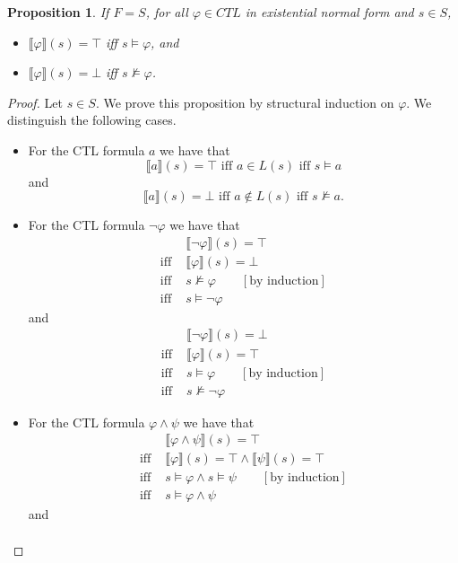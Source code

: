 \documentclass[12pt]{article}
\newtheorem{proposition}{Proposition}
\theoremstyle{definition}
\newcommand{\comment}[1]{\hspace{2em}[\mbox{#1}]}
\newcommand{\satisfaction}[1]{\llbracket #1 \rrbracket}
\newcommand{\bottom}{\mathord{\perp}}
\begin{document}
\begin{proposition}
If $F = S$, for all $\varphi \in \mathit{CTL}$ in existential normal form and $s \in S$, 
\begin{itemize}
\item
$\satisfaction{\varphi}(s) = \top$ iff $s \models \varphi$, and
\item
$\satisfaction{\varphi}(s) = \bottom$ iff $s \not\models \varphi$.
\end{itemize}
\end{proposition}
\begin{proof}
Let $s \in S$.  We prove this proposition by structural induction on $\varphi$.  We distinguish the following cases.
\begin{itemize}
\item 
For the CTL formula $a$ we have that
\[
\satisfaction{a}(s) = \top \mbox{ iff } a \in L(s) \mbox{ iff } s \models a
\]
and
\[
\satisfaction{a}(s) = \bottom \mbox{ iff } a \not\in L(s) \mbox{ iff } s \not\models a.
\]
\item
For the CTL formula $\neg \varphi$ we have that
\begin{align*}
& \satisfaction{\neg \varphi}(s) = \top\\
\mbox{iff } & \satisfaction{\varphi}(s) = \bottom\\
\mbox{iff } & s \not\models \varphi 
\comment{by induction}\\
\mbox{iff } & s \models \neg \varphi 
\end{align*}
and
\begin{align*}
& \satisfaction{\neg \varphi}(s) = \bottom\\
\mbox{iff } & \satisfaction{\varphi}(s) = \top\\
\mbox{iff } & s \models \varphi 
\comment{by induction}\\
\mbox{iff } & s \not\models \neg \varphi 
\end{align*}
\item
For the CTL formula $\varphi \wedge \psi$ we have that
\begin{align*}
& \satisfaction{\varphi \wedge \psi}(s) = \top\\
\mbox{iff } & \satisfaction{\varphi}(s) = \top \wedge \satisfaction{\psi}(s) = \top\\
\mbox{iff } & s \models \varphi \wedge  s \models \psi
\comment{by induction}\\
\mbox{iff } & s \models \varphi \wedge \psi
\end{align*}
and
\begin{align*}

\end{align*}
\end{itemize}
\end{proof}
\end{document}
